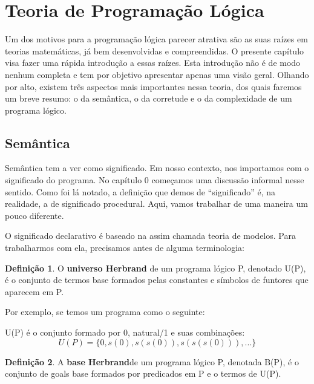 \documentclass{article}
\theoremstyle{definition}
\newtheorem{definition}{Definição}[section]
\theoremstyle{remark}
\begin{document}
\section{Teoria de Programação Lógica}

Um dos motivos para a programação lógica parecer atrativa são as suas raízes em teorias matemáticas, já bem desenvolvidas e compreendidas. O presente capítulo visa fazer uma rápida introdução a essas raízes. Esta introdução não é de modo nenhum completa e tem por objetivo apresentar apenas uma visão geral. Olhando por alto, existem três aspectos mais importantes nessa teoria, dos quais faremos um breve resumo: o da semântica, o da corretude e o da complexidade de um programa lógico.

\subsection{Semântica}
Semântica tem a ver como significado. Em nosso contexto, nos importamos com o significado do programa. No capítulo 0 %
começamos uma discussão informal nesse sentido. Como foi lá notado, a definição que demos de ``significado'' é, na realidade, a de significado procedural. Aqui, vamos trabalhar de uma maneira um pouco diferente.

O significado declarativo é baseado na assim chamada teoria de modelos. Para trabalharmos com ela, precisamos antes de alguma terminologia:

\begin{definition} O \textbf{universo Herbrand} de um programa lógico P, denotado U(P), é o conjunto de termos base formados pelas constantes e símbolos de funtores que aparecem em P.
\end{definition}

Por exemplo, se temos um programa como o seguinte:


\label{lst:natural}

U(P) é o conjunto formado por 0, natural/1 e suas combinações:
\[
  U(P) = \{0, s(0), s(s(0)), s(s(s(0))), ...\}
\]

\begin{definition} A \textbf{base Herbrand}de um programa lógico P, denotada B(P), é o conjunto de goals base formados por predicados em P e o termos de U(P).
\end{definition}
\end{document}
